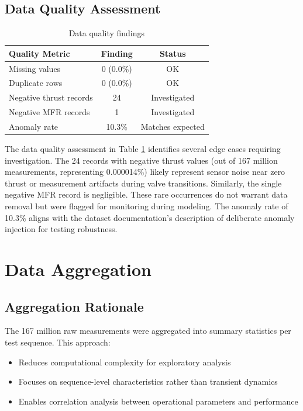 \documentclass[12pt,a4paper]{article}
\begin{document}
\subsection{Data Quality Assessment}

\begin{table}[H]
\centering
\caption{Data quality findings}
\label{tab:data_quality}
\begin{tabular}{lcc}
\toprule
\textbf{Quality Metric} & \textbf{Finding} & \textbf{Status} \\
\midrule
Missing values & 0 (0.0\%) & OK \\
Duplicate rows & 0 (0.0\%) & OK \\
Negative thrust records & 24 & Investigated \\
Negative MFR records & 1 & Investigated \\
Anomaly rate & 10.3\% & Matches expected \\
\bottomrule
\end{tabular}
\end{table}

The data quality assessment in Table \ref{tab:data_quality} identifies several edge cases requiring investigation. The 24 records with negative thrust values (out of 167 million measurements, representing 0.000014\%) likely represent sensor noise near zero thrust or measurement artifacts during valve transitions. Similarly, the single negative MFR record is negligible. These rare occurrences do not warrant data removal but were flagged for monitoring during modeling. The anomaly rate of 10.3\% aligns with the dataset documentation's description of deliberate anomaly injection for testing robustness.

\section{Data Aggregation}

\subsection{Aggregation Rationale}

The 167 million raw measurements were aggregated into summary statistics per test sequence. This approach:
\begin{itemize}
    \item Reduces computational complexity for exploratory analysis
    \item Focuses on sequence-level characteristics rather than transient dynamics
    \item Enables correlation analysis between operational parameters and performance
\end{itemize}
\end{document}
